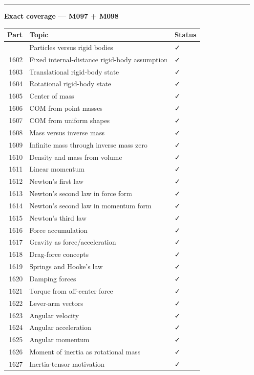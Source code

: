 \begin{center}\rule{0.5\linewidth}{0.5pt}\end{center}

\textbf{Exact coverage --- M097 + M098}

{\def\LTcaptype{none} %
\begin{longtable}[]{@{}rll@{}}
\toprule\noalign{}
Part & Topic & Status \\
\midrule\noalign{}
\endhead
\bottomrule\noalign{}
\endlastfoot
1601 & Particles versus rigid bodies & ✓ \\
1602 & Fixed internal-distance rigid-body assumption & ✓ \\
1603 & Translational rigid-body state & ✓ \\
1604 & Rotational rigid-body state & ✓ \\
1605 & Center of mass & ✓ \\
1606 & COM from point masses & ✓ \\
1607 & COM from uniform shapes & ✓ \\
1608 & Mass versus inverse mass & ✓ \\
1609 & Infinite mass through inverse mass zero & ✓ \\
1610 & Density and mass from volume & ✓ \\
1611 & Linear momentum & ✓ \\
1612 & Newton's first law & ✓ \\
1613 & Newton's second law in force form & ✓ \\
1614 & Newton's second law in momentum form & ✓ \\
1615 & Newton's third law & ✓ \\
1616 & Force accumulation & ✓ \\
1617 & Gravity as force/acceleration & ✓ \\
1618 & Drag-force concepts & ✓ \\
1619 & Springs and Hooke's law & ✓ \\
1620 & Damping forces & ✓ \\
1621 & Torque from off-center force & ✓ \\
1622 & Lever-arm vectors & ✓ \\
1623 & Angular velocity & ✓ \\
1624 & Angular acceleration & ✓ \\
1625 & Angular momentum & ✓ \\
1626 & Moment of inertia as rotational mass & ✓ \\
1627 & Inertia-tensor motivation & ✓ \\

\end{longtable}}
